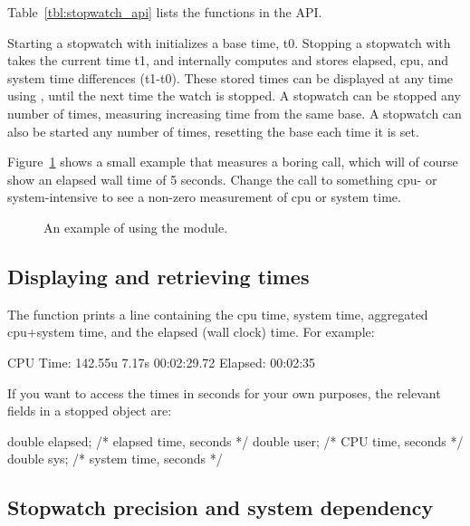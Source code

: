 Table~\ref{tbl:stopwatch_api} lists the functions in the API.

Starting a stopwatch with  initializes
a base time, t0. Stopping a stopwatch with
 takes the current time t1, and
internally computes and stores elapsed, cpu, and system time
differences (t1-t0). These stored times can be displayed at any time
using , until the next time the watch
is stopped. A stopwatch can be stopped any number of times, measuring
increasing time from the same base. A stopwatch can also be started
any number of times, resetting the base each time it is set.

Figure~\ref{fig:stopwatch_example} shows a small example that measures
a boring  call, which will of course show an elapsed
wall time of 5 seconds.  Change the  call to something
cpu- or system-intensive to see a non-zero measurement of cpu or
system time.

\begin{figure}

\caption{An example of using the  module.}
\label{fig:stopwatch_example}
\end{figure}

\subsection{Displaying and retrieving times}

The  function prints a line
containing the cpu time, system time, aggregated cpu+system time, and
the elapsed (wall clock) time. For example:

\begin{cchunk}
CPU Time: 142.55u 7.17s 00:02:29.72 Elapsed: 00:02:35
\end{cchunk}

If you want to access the times in seconds for your own purposes, the
relevant fields in a stopped  object are:

\begin{cchunk}
  double elapsed;               /* elapsed time, seconds */
  double user;                  /* CPU time, seconds     */
  double sys;                   /* system time, seconds  */
\end{cchunk}



\subsection{Stopwatch precision and system dependency}

